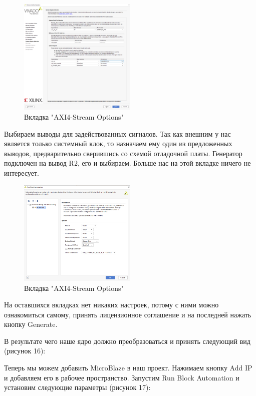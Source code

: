 \documentclass[a4paper,oneside ,10pt]{extreport}
\begin{document}
\begin{figure}[h]
	\centering
	\includegraphics[width=0.5\textwidth]{image/mig_11.png}
	\caption{Вкладка "AXI4-Stream Options"}
	\label{cordic_axi4_stream_options}
\end{figure}

Выбираем выводы для задействованных сигналов. Так как внешним у нас является только системный клок, то назначаем ему один из предложенных выводов, предварительно сверившись со схемой отладочной платы. Генератор подключен на вывод R2, его и выбираем. Больше нас на этой вкладке ничего не интересует.

\begin{figure}[h]
	\centering
	\includegraphics[width=0.5\textwidth]{image/mig_m_0.png}
	\caption{Вкладка "AXI4-Stream Options"}
	\label{mig_m_0}
\end{figure}

На оставшихся вкладках нет никаких настроек, потому с ними можно ознакомиться самому, принять лицензионное соглашение и на последней нажать кнопку Generate.

В результате чего наше ядро должно преобразоваться и принять следующий вид (рисунок 16):

Теперь мы можем добавить MicroBlaze в наш проект. 
Нажимаем кнопку Add IP и добавляем его в рабочее пространство. 
Запустим Run Block Automation и установим следующие параметры (рисунок 17):
\end{document}
